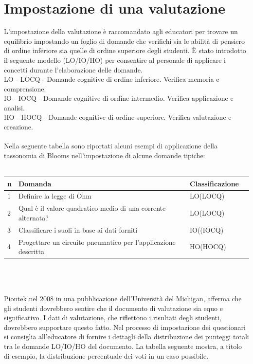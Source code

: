 \section{Impostazione di una valutazione}
\label{sec:problem}
L'impostazione della valutazione è raccomandato agli educatori per trovare un equilibrio impostando un foglio di domande che verifichi sia le abilità di pensiero di ordine inferiore sia quelle di ordine superiore degli studenti.
È stato introdotto il seguente modello (LO/IO/HO) per consentire al personale di applicare i concetti durante l'elaborazione delle domande.\\
LO - LOCQ - Domande cognitive di ordine inferiore. Verifica memoria e comprensione.\\
IO - IOCQ - Domande cognitive di ordine intermedio. Verifica applicazione e analisi.\\
HO - HOCQ - Domande cognitive di ordine superiore. Verifica valutazione e creazione.\\
\\
Nella seguente tabella sono riportati alcuni esempi di applicazione della tassonomia di Blooms nell'impostazione di alcune domande tipiche:\\
\\
\begin{tabular}{|l|l|l|r|}
  \hline
  n & Domanda & Classificazione \\
  \hline
  1 & Definire la legge di Ohm & LO(LOCQ)\\
  \hline
  2 & Qual è il valore quadratico medio di una corrente alternata? & LO(LOCQ) \\
  \hline
  3 & Classificare i suoli in base ai dati forniti & IO((IOCQ)\\
  \hline
  4 & Progettare un circuito pneumatico per l'applicazione descritta & HO(HOCQ)\\
  \hline
  \end{tabular}\\
\\
\\
Piontek nel 2008 in una pubblicazione dell'Università del Michigan, afferma che gli studenti dovrebbero sentire che il documento di valutazione sia equo e significativo. I dati di valutazione, che riflettono i risultati degli studenti, dovrebbero supportare questo fatto.
Nel processo di impostazione dei questionari si consiglia all’educatore di fornire i dettagli della distribuzione dei punteggi totali tra le domande LO/IO/HO del documento. La tabella seguente mostra, a titolo di esempio, la distribuzione percentuale dei voti in un caso possibile.\\
